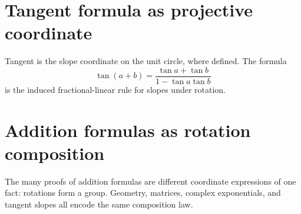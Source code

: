 \section{Tangent formula as projective coordinate}

Tangent is the slope coordinate on the unit circle, where defined.  The formula
\[
  \tan(a+b)=\frac{\tan a+\tan b}{1-\tan a\tan b}
\]
is the induced fractional-linear rule for slopes under rotation.

\section{Addition formulas as rotation composition}

The many proofs of addition formulas are different coordinate expressions of one fact: rotations form a group.  Geometry, matrices, complex exponentials, and tangent slopes all encode the same composition law.
